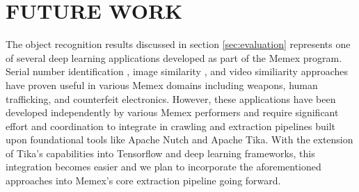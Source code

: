 \section{FUTURE WORK} \label{sec:future}
The object recognition results discussed in section \ref{sec:evaluation} represents one of several deep learning applications developed as part of the Memex program. Serial number identification \cite{parekh2016tesseract}, image similarity \cite{zhou2016multimedia}, and video similiarity \cite{mattmann2016scalable} approaches have proven useful in various Memex domains including weapons, human trafficking, and counterfeit electronics. However, these applications have been developed independently by various Memex performers and require significant effort and coordination to integrate in crawling and extraction pipelines built upon foundational tools like Apache Nutch and Apache Tika. With the extension of Tika's capabilities into Tensorflow and deep learning frameworks, this integration becomes easier and we plan to incorporate the aforementioned approaches into Memex's core extraction pipeline going forward. 

